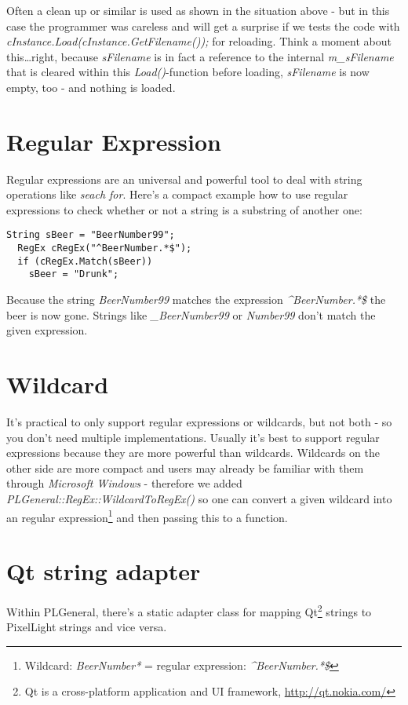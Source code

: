 Often a clean up or similar is used as shown in the situation above - but in this case the programmer was careless and will get a surprise if we tests the code with \emph{cInstance.Load(cInstance.GetFilename());} for reloading. Think a moment about this\ldots right, because \emph{sFilename} is in fact a reference to the internal \emph{m\_sFilename} that is cleared within this \emph{Load()}-function before loading, \emph{sFilename} is now empty, too - and nothing is loaded.




\section{Regular Expression}
Regular expressions are an universal and powerful tool to deal with string operations like \emph{seach for}. Here's a compact example how to use regular expressions to check whether or not a string is a substring of another one:

\begin{lstlisting}[caption=Regular expression example]
  String sBeer = "BeerNumber99";
  RegEx cRegEx("^BeerNumber.*$");
  if (cRegEx.Match(sBeer))
    sBeer = "Drunk";
\end{lstlisting}

Because the string \emph{BeerNumber99} matches the expression \emph{\textasciicircum BeerNumber.*\$} the beer is now gone. Strings like \emph{\_BeerNumber99} or \emph{Number99} don't match the given expression.




\section{Wildcard}
It's practical to only support regular expressions or wildcards, but not both - so you don't need multiple implementations. Usually it's best to support regular expressions because they are more powerful than wildcards. Wildcards on the other side are more compact and users may already be familiar with them through \emph{Microsoft Windows} - therefore we added \emph{PLGeneral::RegEx::WildcardToRegEx()} so one can convert a given wildcard into an regular expression\footnote{Wildcard: \emph{BeerNumber*} = regular expression: \emph{\textasciicircum BeerNumber.*\$}} and then passing this to a function.




\section{Qt string adapter}
Within PLGeneral, there's a static adapter class for mapping Qt\footnote{Qt is a cross-platform application and UI framework, \url{http://qt.nokia.com/}} strings to PixelLight strings and vice versa.

